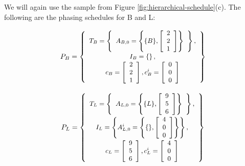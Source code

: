 We will again use the sample {\feedbackloop} from Figure
\ref{fig:hierarchical-schedule}(c).  The following are the phasing
schedules for {\filters} B and L:

\begin{displaymath} \small
P_B = \left\{
\begin{array}{c}
T_B = \left\{
\begin{array}{c}
A_{B,0} = \left\{ \{B\}, \left[\begin{array}{c} 2 \\ 2 \\ 1 \end{array}\right]\right\} \\
\end{array}\right\}, \\
I_B = \left\{ \right\}, \\
c_B = \left[ \begin{array}{c} 2 \\ 2 \\ 1 \end{array} \right],
c^i_B = \left[ \begin{array}{c} 0 \\ 0 \\ 0
\end{array} \right]
\end{array}
\right\}
\end{displaymath}

\begin{displaymath} \small
P_L = \left\{
\begin{array}{c}
T_L = \left\{
\begin{array}{c}
A_{L,0} = \left\{ \{L\}, \left[\begin{array}{c} 9 \\ 5 \\ 6 \end{array}\right]\right\} \\
\end{array}\right\}, \\
I_L = \left\{ A^i_{L,0} = \left\{ \{ \}, \left[\begin{array}{c} 4 \\ 0 \\ 0 \end{array}\right]\right\} \right\}, \\
c_L = \left[ \begin{array}{c} 9 \\ 5 \\ 6 \end{array} \right],
c^i_L = \left[ \begin{array}{c} 4 \\ 0 \\ 0
\end{array} \right]
\end{array}
\right\}
\end{displaymath}

